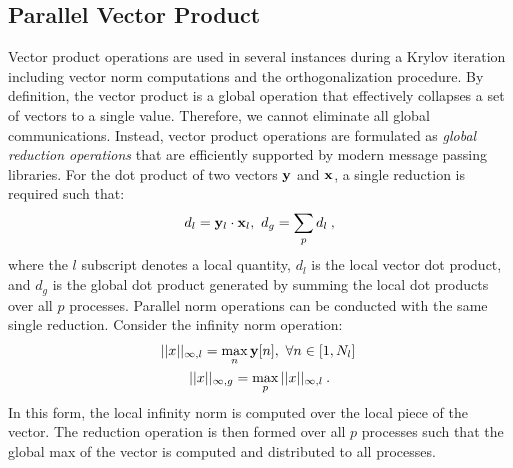 \subsection{Parallel Vector Product}
\label{subsec:parallel_vector_product}
Vector product operations are used in several instances during a
Krylov iteration including vector norm computations and the
orthogonalization procedure. By definition, the vector product is a
global operation that effectively collapses a set of vectors to a
single value. Therefore, we cannot eliminate all global
communications. Instead, vector product operations are formulated as
\textit{global reduction operations} that are efficiently supported by
modern message passing libraries. For the dot product of two vectors
$\mathbf{y}$ and $\mathbf{x}$, a single reduction is required such that:
\begin{equation}
  d_l = \mathbf{y}_l \cdot \mathbf{x}_l,\ d_g = \sum_p d_l \:,  
  \label{eq:parallel_dot_product}
\end{equation}
where the $l$ subscript denotes a local quantity, $d_l$ is the local
vector dot product, and $d_g$ is the global dot product generated by
summing the local dot products over all $p$ processes. Parallel norm
operations can be conducted with the same single reduction. Consider
the infinity norm operation:
\begin{subequations}
  \begin{gather}
    ||x||_{\infty,l} = \max_n \mathbf{y}[n],\ \forall n \in [1,N_l]\:\\
    ||x||_{\infty,g} = \max_p ||x||_{\infty,l}\:.
  \end{gather}
  \label{eq:parallel_infinity_norm}
\end{subequations}
In this form, the local infinity norm is computed over the local piece
of the vector. The reduction operation is then formed over all $p$
processes such that the global max of the vector is computed and
distributed to all processes.


